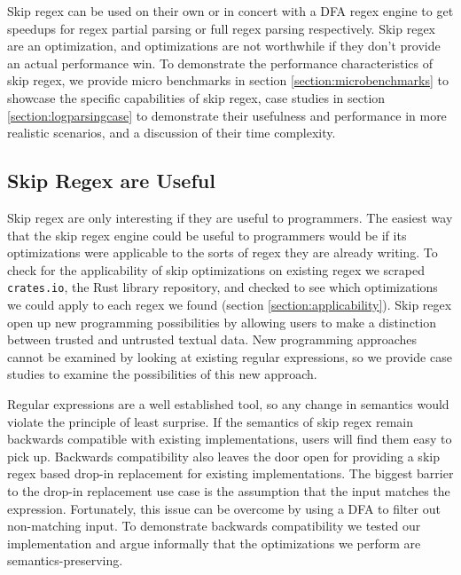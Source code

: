 Skip regex can be used on their own or
in concert with a DFA regex engine to get speedups for
regex partial parsing or full regex parsing respectively.
Skip regex are an optimization, and optimizations are not worthwhile if
they don't provide an actual performance win. To demonstrate
the performance characteristics
of skip regex, we provide micro benchmarks in section
\ref{section:microbenchmarks} to showcase the specific
capabilities of skip regex, case studies in section
\ref{section:logparsingcase} to demonstrate their
usefulness and performance in more realistic scenarios, and a
discussion of their time complexity.

\subsection{Skip Regex are Useful}

Skip regex are only interesting if they are useful to programmers.
The easiest way that the skip regex engine could be useful to programmers
would be if its optimizations were applicable to the sorts of regex they
are already writing. To check for the applicability of skip optimizations
on existing regex we scraped \verb'crates.io',
the Rust library repository, and checked
to see which optimizations
we could apply to each regex we found (section \ref{section:applicability}).
Skip regex open up new programming
possibilities by allowing users to make a distinction between trusted
and untrusted textual data. New programming approaches cannot be 
examined by looking at existing regular expressions, so we provide
case studies to examine the possibilities of this new approach.

Regular expressions are a well established tool, so any change in
semantics would violate the principle of least surprise.
If the semantics of skip regex remain backwards compatible with
existing implementations, users will find them easy to pick up.
Backwards compatibility also leaves the door open for providing
a skip regex based drop-in replacement for existing implementations.
The biggest barrier to the drop-in replacement use case is the
assumption that the input matches the expression. Fortunately,
this issue can be overcome by using a DFA to filter out non-matching
input. To demonstrate backwards compatibility we tested our implementation
and argue informally that the optimizations we perform are
semantics-preserving.


